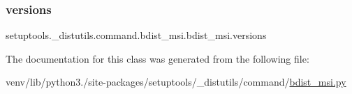 \subsubsection{\texorpdfstring{versions}{versions}}
{\footnotesize\ttfamily setuptools.\+\_\+distutils.\+command.\+bdist\+\_\+msi.\+bdist\+\_\+msi.\+versions}



The documentation for this class was generated from the following file\+:\begin{DoxyCompactItemize}
\item 
venv/lib/python3./site-\/packages/setuptools/\+\_\+distutils/command/\hyperlink{bdist__msi_8py}{bdist\+\_\+msi.\+py}\end{DoxyCompactItemize}
